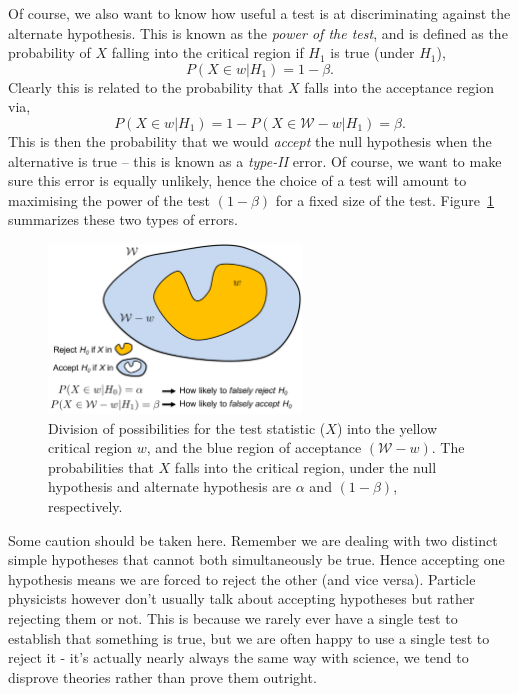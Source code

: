 Of course, we also want to know how useful a test is at discriminating against the alternate hypothesis. This is known as the \emph{power of the test}, and is defined as the probability of $X$ falling into the critical region if $H_1$ is true (under $H_1$), 
\begin{equation}\label{eqn:power}
     P(X\in w|H_{1})=1-\beta.
\end{equation}
Clearly this is related to the probability that $X$ falls into the acceptance region via,
\begin{equation}
 P(X\in w|H_{1})=1-P(X\in \mathcal{W}-w|H_{1})=\beta.
\end{equation}
This is then the probability that we would \emph{accept} the null hypothesis when the alternative is true -- this is known as a \emph{type-II} error. Of course, we want to make sure this error is equally unlikely, hence the choice of a test will amount to maximising the power of the test $(1-\beta)$ for a fixed size of the test.  Figure~\ref{fig:htestregions} summarizes these two types of errors. 
\begin{figure}[hbt!]
    \centering
    \includegraphics[width=0.6\textwidth]{figures/Hypotest/type12.pdf}
    \caption{Division of possibilities for the test statistic ($X$) into the yellow critical region $w$, and the blue region of acceptance $(\mathcal{W}-w)$. The probabilities that $X$ falls into the critical region, under the null hypothesis and alternate hypothesis are $\alpha$ and $(1-\beta)$, respectively.}
    \label{fig:htestregions}
\end{figure}
Some caution should be taken here. Remember we are dealing with two distinct simple hypotheses that cannot both simultaneously be true. Hence accepting one hypothesis means we are forced to reject the other (and vice versa). Particle physicists however don't usually talk about accepting hypotheses but rather rejecting them or not. This is because we rarely ever have a single test to establish that something is true, but we are often happy to use a single test to reject it - it's actually nearly always the same way with science, we tend to disprove theories  rather than prove them outright.

